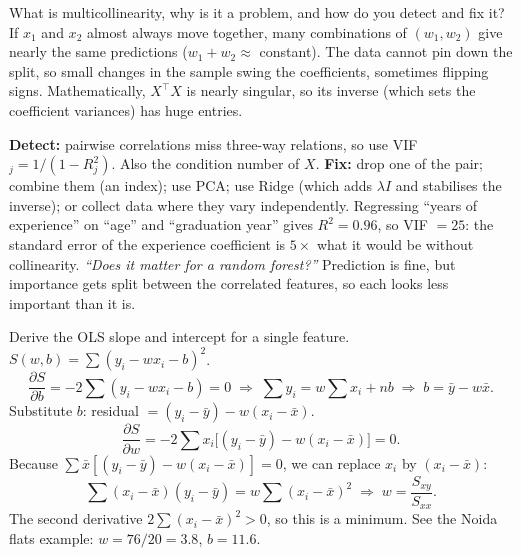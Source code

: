 \begin{qa}{ What is multicollinearity, why is it a problem, and how do you
detect and fix it?}
\why
If $x_1$ and $x_2$ almost always move together, many combinations of $(w_1, w_2)$ give nearly the same predictions
($w_1 + w_2 \approx$ constant). The data cannot pin down the split, so small changes in the sample swing the
coefficients, sometimes flipping signs. Mathematically, $X^\top X$ is nearly singular, so its inverse (which sets
the coefficient variances) has huge entries.

\textbf{Detect:} pairwise correlations miss three-way relations, so use VIF$_j = 1/(1-R_j^2)$. Also the condition
number of $X$. \textbf{Fix:} drop one of the pair; combine them (an index); use PCA; use Ridge (which adds $\lambda I$ and
stabilises the inverse); or collect data where they vary independently.
\worked Regressing ``years of experience'' on ``age'' and ``graduation year'' gives $R^2 = 0.96$, so VIF $= 25$: the
standard error of the experience coefficient is $5\times$ what it would be without collinearity.
\pushes \emph{``Does it matter for a random forest?''} Prediction is fine, but importance gets split between the
correlated features, so each looks less important than it is.
\end{qa}

\begin{qa}{Derive the OLS slope and intercept for a single feature.}
\why
$S(w,b) = \sum(y_i - wx_i - b)^2$.
\[ \frac{\partial S}{\partial b} = -2\sum(y_i - wx_i - b) = 0 \;\Rightarrow\; \sum y_i = w\sum x_i + nb \;\Rightarrow\; b = \bar y - w\bar x. \]
Substitute $b$: residual $= (y_i - \bar y) - w(x_i - \bar x)$.
\[ \frac{\partial S}{\partial w} = -2\sum x_i\big[(y_i-\bar y) - w(x_i-\bar x)\big] = 0. \]
Because $\sum \bar x[(y_i-\bar y) - w(x_i - \bar x)] = 0$, we can replace $x_i$ by $(x_i - \bar x)$:
\[ \sum(x_i-\bar x)(y_i-\bar y) = w\sum(x_i-\bar x)^2 \;\Rightarrow\; w = \frac{S_{xy}}{S_{xx}}. \]
The second derivative $2\sum(x_i - \bar x)^2 > 0$, so this is a minimum.
\worked See the Noida flats example: $w = 76/20 = 3.8$, $b = 11.6$.
\end{qa}

